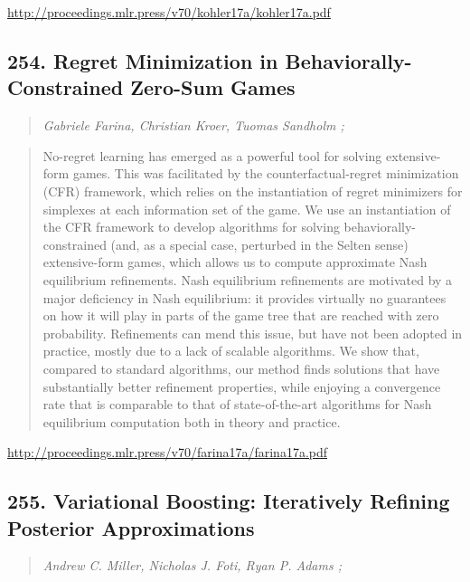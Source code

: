 \documentclass{article}
\begin{document}
\href{http://proceedings.mlr.press/v70/kohler17a/kohler17a.pdf}{http://proceedings.mlr.press/v70/kohler17a/kohler17a.pdf}

\subsection{254. Regret Minimization in Behaviorally-Constrained Zero-Sum Games}

\begin{quote}
\footnotesize{\textit{Gabriele Farina, Christian Kroer, Tuomas Sandholm ;}}
\end{quote}

\begin{quote}
    No-regret learning has emerged as a powerful tool for solving extensive-form games. This was facilitated by the counterfactual-regret minimization (CFR) framework, which relies on the instantiation of regret minimizers for simplexes at each information set of the game. We use an instantiation of the CFR framework to develop algorithms for solving behaviorally-constrained (and, as a special case, perturbed in the Selten sense) extensive-form games, which allows us to compute approximate Nash equilibrium refinements. Nash equilibrium refinements are motivated by a major deficiency in Nash equilibrium: it provides virtually no guarantees on how it will play in parts of the game tree that are reached with zero probability. Refinements can mend this issue, but have not been adopted in practice, mostly due to a lack of scalable algorithms. We show that, compared to standard algorithms, our method finds solutions that have substantially better refinement properties, while enjoying a convergence rate that is comparable to that of state-of-the-art algorithms for Nash equilibrium computation both in theory and practice.  \end{quote}

\href{http://proceedings.mlr.press/v70/farina17a/farina17a.pdf}{http://proceedings.mlr.press/v70/farina17a/farina17a.pdf}

\subsection{255. Variational Boosting: Iteratively Refining Posterior Approximations}

\begin{quote}
\footnotesize{\textit{Andrew C. Miller, Nicholas J. Foti, Ryan P. Adams ;}}
\end{quote}
\end{document}
